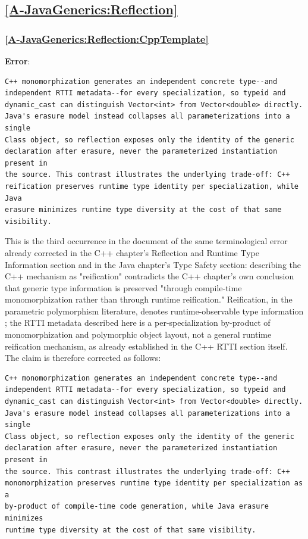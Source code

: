 \documentclass[11pt]{report}
\begin{document}
\subsection*{\hyperref[A-JavaGenerics:Reflection]{\ref*{A-JavaGenerics:Reflection} }}

\subsubsection*{\hyperref[A-JavaGenerics:Reflection:CppTemplate]{\ref*{A-JavaGenerics:Reflection:CppTemplate} }}
\noindent\textbf{Error}:
\begin{Verbatim}[breaklines=true]
C++ monomorphization generates an independent concrete type--and
independent RTTI metadata--for every specialization, so typeid and
dynamic_cast can distinguish Vector<int> from Vector<double> directly.
Java's erasure model instead collapses all parameterizations into a single
Class object, so reflection exposes only the identity of the generic
declaration after erasure, never the parameterized instantiation present in
the source. This contrast illustrates the underlying trade-off: C++
reification preserves runtime type identity per specialization, while Java
erasure minimizes runtime type diversity at the cost of that same
visibility.
\end{Verbatim}
This is the third occurrence in the document of the same terminological
error already corrected in the C++ chapter's Reflection and Runtime Type
Information section and in the Java chapter's Type Safety section:
describing the C++ mechanism as "reification" contradicts the C++ chapter's
own conclusion that generic type information is preserved "through
compile-time monomorphization rather than through runtime reification."
Reification, in the parametric polymorphism literature, denotes
runtime-observable type information \cite{cardelli1985}; the RTTI metadata
described here is a per-specialization by-product of monomorphization and
polymorphic object layout, not a general runtime reification mechanism, as
already established in the C++ RTTI section itself. The claim is therefore
corrected as follows:
\begin{Verbatim}[breaklines=true]
C++ monomorphization generates an independent concrete type--and
independent RTTI metadata--for every specialization, so typeid and
dynamic_cast can distinguish Vector<int> from Vector<double> directly.
Java's erasure model instead collapses all parameterizations into a single
Class object, so reflection exposes only the identity of the generic
declaration after erasure, never the parameterized instantiation present in
the source. This contrast illustrates the underlying trade-off: C++
monomorphization preserves runtime type identity per specialization as a
by-product of compile-time code generation, while Java erasure minimizes
runtime type diversity at the cost of that same visibility.
\end{Verbatim}
\end{document}
